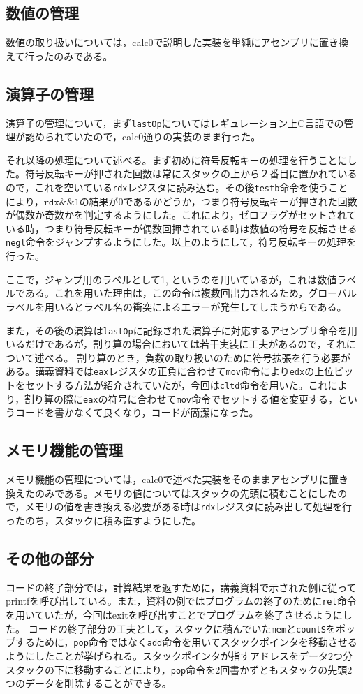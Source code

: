 \documentclass[a4paper]{jsarticle}
\newcommand{\var}[1]{\texttt{#1}}
\begin{document}
\subsection{数値の管理}
数値の取り扱いについては，calc0で説明した実装を単純にアセンブリに置き換えて行ったのみである。

\subsection{演算子の管理}
演算子の管理について，まず\var{lastOp}についてはレギュレーション上C言語での管理が認められていたので，calc0通りの実装のまま行った。

それ以降の処理について述べる。まず初めに符号反転キーの処理を行うことにした。符号反転キーが押された回数は常にスタックの上から２番目に置かれているので，これを空いている\var{rdx}レジスタに読み込む。その後\var{testb}命令を使うことにより，$\var{rdx} \&\& 1$の結果が0であるかどうか，つまり符号反転キーが押された回数が偶数か奇数かを判定するようにした。これにより，ゼロフラグがセットされている時，つまり符号反転キーが偶数回押されている時は数値の符号を反転させる\var{negl}命令をジャンプするようにした。以上のようにして，符号反転キーの処理を行った。

ここで，ジャンプ用のラベルとして1, というのを用いているが，これは数値ラベルである。これを用いた理由は，この命令は複数回出力されるため，グローバルラベルを用いるとラベル名の衝突によるエラーが発生してしまうからである。

また，その後の演算は\var{lastOp}に記録された演算子に対応するアセンブリ命令を用いるだけであるが，割り算の場合においては若干実装に工夫があるので，それについて述べる。
割り算のとき，負数の取り扱いのために符号拡張を行う必要がある。講義資料では\var{eax}レジスタの正負に合わせて\var{mov}命令により\var{edx}の上位ビットをセットする方法が紹介されていたが，今回は\var{cltd}命令を用いた。これにより，割り算の際に\var{eax}の符号に合わせて\var{mov}命令でセットする値を変更する，というコードを書かなくて良くなり，コードが簡潔になった。

\subsection{メモリ機能の管理}
メモリ機能の管理については，calc0で述べた実装をそのままアセンブリに置き換えたのみである。メモリの値についてはスタックの先頭に積むことにしたので，メモリの値を書き換える必要がある時は\var{rdx}レジスタに読み出して処理を行ったのち，スタックに積み直すようにした。

\subsection{その他の部分}
コードの終了部分では，計算結果を返すために，講義資料で示された例に従ってprintfを呼び出している。また，資料の例ではプログラムの終了のために\var{ret}命令を用いていたが，今回はexitを呼び出すことでプログラムを終了させるようにした。
コードの終了部分の工夫として，スタックに積んでいた\var{mem}と\var{countS}をポップするために，\var{pop}命令ではなく\var{add}命令を用いてスタックポインタを移動させるようにしたことが挙げられる。スタックポインタが指すアドレスをデータ2つ分スタックの下に移動することにより，\var{pop}命令を2回書かずともスタックの先頭2つのデータを削除することができる。
\end{document}
